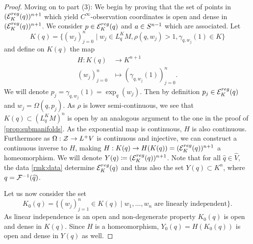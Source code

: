 \begin{proof}
    Moving on to part (3): We begin by proving that the set of points in $({{\mathcal{E}}^{reg}_K}(q))^{n+1}$ which yield $C^\infty$-observation coordinates is open and dense in $({{\mathcal{E}}^{reg}_K}(q))^{n+1}$.
    We consider $p\in {{\mathcal{E}}^{reg}_K}(q)$ and $a\in {S^{n-1}}$ which are associated. 
    Let 
    \[
        K(q) = \{(w_j)^n_{j=0} \mid w_j\in L^K_qM, \rho(q,w_j) > 1, \gamma_{q,w_j}(1)\in K\}
    \]
    and define on $K(q)$ the map
    \begin{align*}
        H:K(q)&\to K^{n+1}\\
        (w_j)^n_{j=0}&\mapsto (\gamma_{q,w_j}(1))^n_{j=0}.
    \end{align*}
    We will denote $p_j = \gamma_{q,w_j}(1) = \exp_q(w_j)$. Then by definition $p_j\in {{\mathcal{E}}^{reg}_K}(q)$ and $w_j = \Omega(q,p_j)$. As $\rho$ is lower semi-continuous, we see that $K(q)\subset (L_q^KM)^n$ is open by an analogous argument to the one in the proof of \ref{prop:submanifolds}. As the exponential map is continuous, $H$ is also continuous. Furthermore as $\Omega:{\mathcal{Z}}\to L^+V$ is continuous and injective, we can construct a continuous inverse to $H$, making $H:K(q) \to H(K(q)) = ({{\mathcal{E}}^{reg}_K}(q))^{n+1}$ a homeomorphism.
    We will denote $Y(q)\coloneqq({{\mathcal{E}}^{reg}_K}(q))^{n+1}$.
    Note that for all $\widehat{q}\in \widehat{V}$, the data \ref{rmk:data} determine ${{\mathcal{E}}^{reg}_K}(q)$ and thus also the set $Y(q)\subset K^n$, where $q=\mathcal{F}^{-1}(\widehat{q})$.
    
    Let us now consider the set 
    \[
        K_0(q) = \{(w_j)_{j=1}^n\in K(q) \mid w_1,\dots,w_n \text{ are linearly independent}\}.
    \]
    As linear independence is an open and non-degenerate property $K_0(q)$ is open and dense in $K(q)$. Since $H$ is a homeomorphism, $Y_0(q) = H(K_0(q))$ is open and dense in $Y(q)$ as well.
    

\end{proof}

